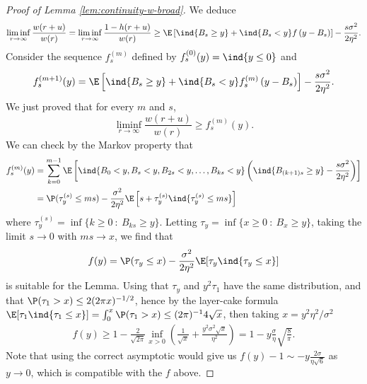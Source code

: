 \documentclass[10pt,a4paper]{article}
\begin{document}
\begin{proof}[Proof of Lemma \ref{lem:continuity-w-broad}]
We deduce
\begin{equation*}
\liminf_{r\to\infty} \frac{w(r+u)}{w(r)} = \liminf_{r\to\infty} \frac{1-h(r+u)}{w(r)} \geq \E\left[\ind{B_s\geq y} + \ind{B_s<y} f\left(y - B_s\right) \right] - \frac{s \sigma^2}{2\eta^2} .
\end{equation*}
Consider the sequence $f_s^{(m)}$ defined by $f_s^{(0)}(y) = \ind{y\leq 0}$ and 
\[ f_s^{(m+1)}(y) = \E\left[\ind{B_{s}\geq y} + \ind{B_{s}<y}f_s^{(m)}\left(y-B_{s}\right)\right] - \frac{s \sigma^2}{2\eta^2} . \]
We just proved that for every $m$ and $s$, 
\[ \liminf_{r\to\infty} \frac{w(r+u)}{w(r)} \geq f_s^{(m)}(y) . \]
We can check by the Markov property that
\begin{align*}
f_s^{(m)}(y) &= \sum_{k=0}^{m-1} \E\left[\ind{B_0 < y, B_s<y, B_{2s}<y, \dots, B_{ks}<y} \left(\ind{B_{(k+1)s}\geq y} - \frac{s \sigma^2}{2\eta^2} \right) \right] \\
&= \P(\tau_y^{(s)} \leq ms) - \frac{\sigma^2}{2\eta^2} \E\left[ s + \tau_y^{(s)}\ind{\tau_y^{(s)} \leq ms} \right]
\end{align*}
where $\tau_y^{(s)} = \inf \{k\geq 0\ :\ B_{ks}\geq y \}$. Letting $\tau_y = \inf\{x\geq 0 \ : \ B_x\geq y\}$, taking the limit $s\to 0$ with $ms\to x$, we find that 
\[ f(y) = \P(\tau_y \leq x) - \frac{\sigma^2}{2\eta^2} \E[\tau_y \ind{\tau_y \leq x}] \]
is suitable for the Lemma. Using that $\tau_y$ and $y^2 \tau_1$ have the same distribution, and that $\P(\tau_1>x) \leq 2(2\pi x)^{-1/2}$, hence by the layer-cake formula $\E[\tau_1 \ind{\tau_1\leq x}] = \int_0^x \P(\tau_1>x) \leq (2\pi)^{-1} 4\sqrt{x}$, then taking $x = y^2 \eta^2 / \sigma^2$
\begin{align*}
f(y) \geq 1 - \frac{2}{\sqrt{2\pi}}\inf_{x>0} \left(\frac{1}{\sqrt{x}} + \frac{y^2 \sigma^2 \sqrt{x}}{\eta^2} \right) = 1 - y \frac{\sigma}{\eta}\sqrt{\frac{8}{\pi}} .
\end{align*}
Note that using the correct asymptotic would give us $f(y)-1 \sim - y \frac{2\sigma}{\eta\sqrt{6}}$ as $y\to 0$, which is compatible with the $f$ above. 




\end{proof}
\end{document}

